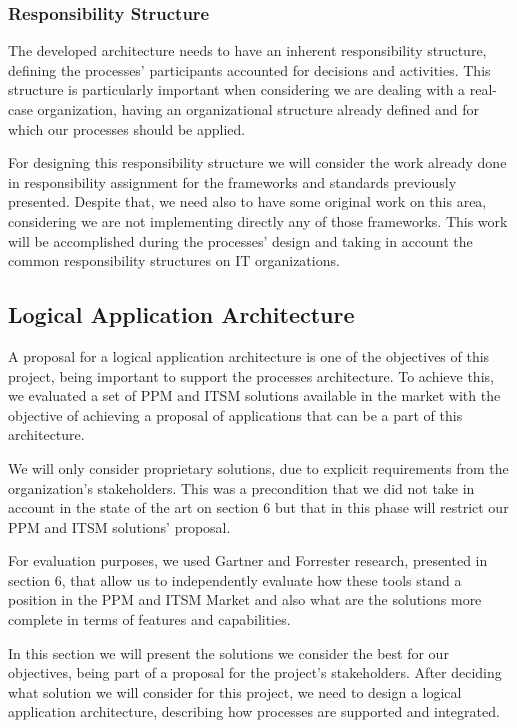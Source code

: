 \subsubsection{Responsibility Structure}

The developed architecture needs to have an inherent responsibility structure, defining the processes' participants accounted for decisions and activities. This structure is particularly important when considering we are dealing with a real-case organization, having an organizational structure already defined and for which our processes should be applied.\par
For designing this responsibility structure we will consider the work already done in responsibility assignment for the frameworks and standards previously presented. Despite that, we need also to have some original work on this area, considering we are not implementing directly any of those frameworks. This work will be accomplished during the processes' design and taking in account the common responsibility structures on IT organizations.\par 

\subsection{Logical Application Architecture}

A proposal for a logical application architecture is one of the objectives of this project, being important to support the processes architecture. To achieve this, we evaluated a set of PPM and ITSM solutions available in the market with the objective of achieving a proposal of applications that can be a part of this architecture.\par
We will only consider proprietary solutions, due to explicit requirements from the organization's stakeholders. This was a precondition that we did not take in account in the state of the art on section 6 but that in this phase will restrict our PPM and ITSM solutions' proposal.\par 
For evaluation purposes, we used Gartner and Forrester research, presented in section 6, that allow us to independently evaluate how these tools stand a position in the PPM and ITSM Market and also what are the solutions more complete in terms of features and capabilities.\par
In this section we will present the solutions we consider the best for our objectives, being part of a proposal for the project's stakeholders. After deciding what solution we will consider for this project, we need to design a logical application architecture, describing how processes are supported and integrated.\par

